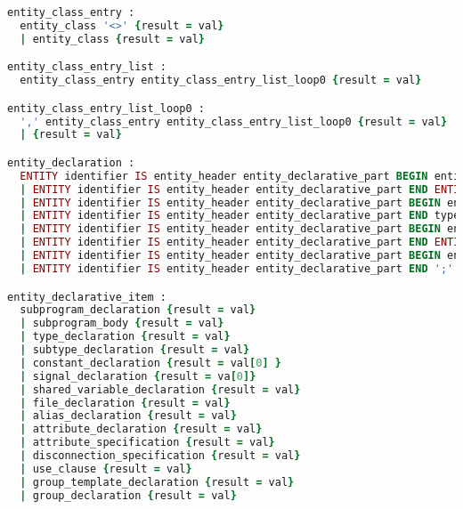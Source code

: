 \begin{lstlisting}[language=Ruby, style=rubystyle]
entity_class_entry :
  entity_class '<>' {result = val}
  | entity_class {result = val}

entity_class_entry_list :
  entity_class_entry entity_class_entry_list_loop0 {result = val}

entity_class_entry_list_loop0 :
  ',' entity_class_entry entity_class_entry_list_loop0 {result = val}
  | {result = val}

entity_declaration :
  ENTITY identifier IS entity_header entity_declarative_part BEGIN entity_statement_part END ENTITY type_name ';' { InitializeRepository.add(val[1]) ;result = EntityDeclaration.new(val[1], val[3], val[4].flatten);}
  | ENTITY identifier IS entity_header entity_declarative_part END ENTITY type_name ';' { InitializeRepository.add(val[1]) ;result = EntityDeclaration.new(val[1], val[3], val[4].flatten);}
  | ENTITY identifier IS entity_header entity_declarative_part BEGIN entity_statement_part END type_name ';' { InitializeRepository.add(val[1]) ;result = EntityDeclaration.new(val[1], val[3], val[4].flatten);}
  | ENTITY identifier IS entity_header entity_declarative_part END type_name ';' { InitializeRepository.add(val[1]) ;result = EntityDeclaration.new(val[1], val[3], val[4].flatten);}
  | ENTITY identifier IS entity_header entity_declarative_part BEGIN entity_statement_part END ENTITY ';' { InitializeRepository.add(val[1]) ;result = EntityDeclaration.new(val[1], val[3], val[4].flatten);}
  | ENTITY identifier IS entity_header entity_declarative_part END ENTITY ';' { InitializeRepository.add(val[1]) ;result = EntityDeclaration.new(val[1], val[3], val[4].flatten);}
  | ENTITY identifier IS entity_header entity_declarative_part BEGIN entity_statement_part END ';' { InitializeRepository.add(val[1]) ;result = EntityDeclaration.new(val[1], val[3], val[4].flatten);}
  | ENTITY identifier IS entity_header entity_declarative_part END ';' { InitializeRepository.add(val[1]) ;result = EntityDeclaration.new(val[1], val[3], val[4].flatten);}

entity_declarative_item :
  subprogram_declaration {result = val}
  | subprogram_body {result = val}
  | type_declaration {result = val}
  | subtype_declaration {result = val}
  | constant_declaration {result = val[0] }
  | signal_declaration {result = va[0]}
  | shared_variable_declaration {result = val}
  | file_declaration {result = val}
  | alias_declaration {result = val}
  | attribute_declaration {result = val}
  | attribute_specification {result = val}
  | disconnection_specification {result = val}
  | use_clause {result = val}
  | group_template_declaration {result = val}
  | group_declaration {result = val}


\end{lstlisting}

